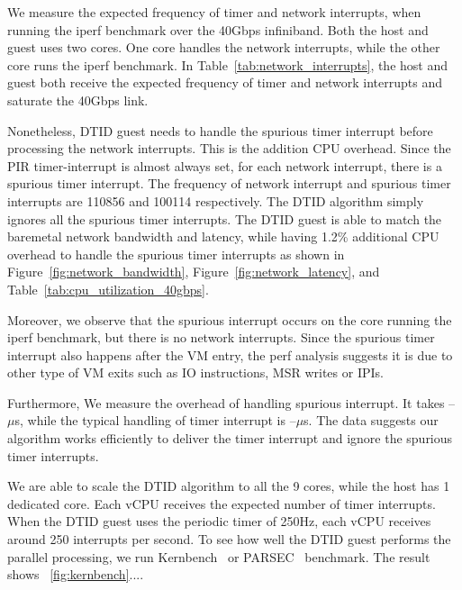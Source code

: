 We measure the expected frequency of timer and network
interrupts, when running the iperf benchmark over the 40Gbps
infiniband. Both the host and guest uses two cores. One core
handles the network interrupts, while the other core runs the
iperf benchmark. In Table~\ref{tab:network_interrupts}, the
host and guest both receive the expected frequency of timer
and network interrupts and saturate the 40Gbps link.

Nonetheless, DTID guest needs to handle the spurious timer
interrupt before processing the network interrupts. This is
the addition CPU overhead. Since the PIR timer-interrupt is
almost always set, for each network interrupt, there is a
spurious timer interrupt. The frequency of network interrupt
and spurious timer interrupts are 110856 and 100114
respectively. The DTID algorithm simply ignores all the
spurious timer interrupts. The DTID guest is able to match the
baremetal network bandwidth and latency, while having 1.2\%
additional CPU overhead to handle the spurious timer
interrupts as shown in Figure~\ref{fig:network_bandwidth},
Figure~\ref{fig:network_latency}, and
Table~\ref{tab:cpu_utilization_40gbps}.

Moreover, we observe that the spurious interrupt occurs on the
core running the iperf benchmark, but there is no network
interrupts. Since the spurious timer interrupt also happens
after the VM entry, the perf analysis suggests it is due to
other type of VM exits such as IO instructions, MSR writes or
IPIs.

Furthermore, We measure the overhead of handling spurious
interrupt. It takes --$\mu$s, while the typical handling of
timer interrupt is --$\mu$s. The data suggests our algorithm
works efficiently to deliver the timer interrupt and ignore
the spurious timer interrupts.

We are able to scale the DTID algorithm to all the 9 cores,
while the host has 1 dedicated core. Each vCPU receives the
expected number of timer interrupts. When the DTID guest uses
the periodic timer of 250Hz, each vCPU receives around 250
interrupts per second. To see how well the DTID guest performs
the parallel processing, we run Kernbench~\cite{kernbench} or
PARSEC~\cite{bienia:2008} benchmark. The result shows
~\ref{fig:kernbench}....
